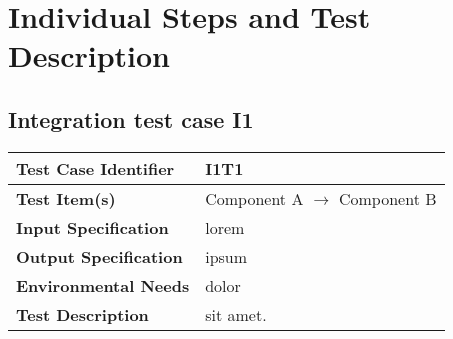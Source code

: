 \chapter{Individual Steps and Test Description}
\label{chap:individual-steps}

\section{Integration test case I1}

\begin{tabular}{l p{}}
    \hline
    \textbf{Test Case Identifier} & I1T1\\
    \hline
    \textbf{Test Item(s)} & Component A $\rightarrow$ Component B\\
    \hline
    \textbf{Input Specification} & lorem\\
    \hline
    \textbf{Output Specification} & ipsum\\
    \hline
    \textbf{Environmental Needs} & dolor\\
    \hline
    \textbf{Test Description} & sit amet.\\
    \hline
\end{tabular}
